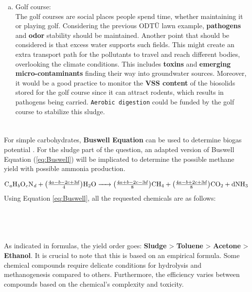 \documentclass[a4paper]{article}
\begin{document}
\begin{enumerate}[a)]
    \item Golf course:\\
    The golf courses are social places people spend time, whether maintaining it or playing golf. Considering the previous ODTÜ lawn example, \textbf{pathogens} and \textbf{odor} stability should be maintained. Another point that should be considered is that excess water supports such fields. This might create an extra transport path for the pollutants to travel and reach different bodies, overlooking the climate conditions. This includes \textbf{toxins} and \textbf{emerging micro-contaminants} finding their way into groundwater sources. Moreover, it would be a good practice to monitor the \textbf{VSS content} of the biosolids stored for the golf course since it can attract rodents, which results in pathogens being carried\autocite{vesilind1988}. \texttt{Aerobic digestion} could be funded by the golf course to stabilize this sludge.
\end{enumerate}
\section{} %
\begin{minipage}[c]{0.5\textwidth}
For simple carbohydrates, \textbf{Buswell Equation} can be used to determine biogas potential \autocite{buswell1933}. For the sludge part of the question, an adapted version of Buswell Equation (\ref{eq:Buswell}) will be implicated to determine the possible methane yield with possible ammonia production\autocite{Angelidaki2004, sialve2009}.
\end{minipage}
\hfill
\begin{minipage}{0.4\textwidth}
\end{minipage}
\begin{equation}
    \scalebox{1}{\ce{C_aH_bO_cN_d + $\left(\frac{4a - b - 2c + 3d}{4}\right)$H2O -> $\left(\frac{4a + b - 2c - 3d}{8}\right)$CH4 +  $\left(\frac{4a - b + 2c + 3d}{8}\right)$CO2 + dNH3}\label{eq:Buswell}}
\end{equation}
Using Equation \ref{eq:Buswell}, all the requested chemicals are as follows:\\
\\
\\
\\
\\
As indicated in formulas, the yield order goes: \textbf{Sludge} > \textbf{Toluene} > \textbf{Acetone} > \textbf{Ethanol}. It is crucial to note that this is based on an empirical formula. Some chemical compounds require delicate conditions for hydrolysis and methanogenesis compared to others. Furthermore, the efficiency varies between compounds based on the chemical's complexity and toxicity\autocite{Edwards1994}.
\end{document}
